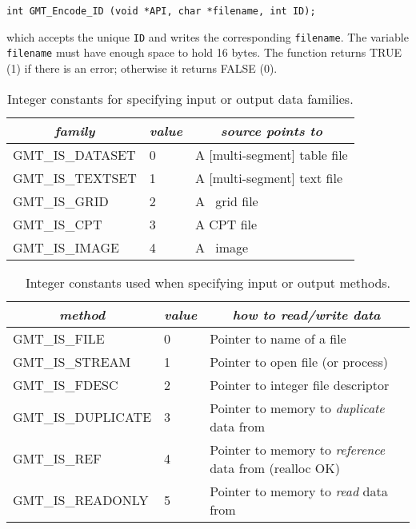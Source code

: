 \documentclass[11pt]{report}
\begin{document}
\begin{verbatim}
int GMT_Encode_ID (void *API, char *filename, int ID);
\end{verbatim}
which accepts the unique \texttt{ID} and writes the corresponding \texttt{filename}.
The variable \texttt{filename} must have enough space to hold 16 bytes.
The function returns TRUE (1) if there is an error; otherwise it returns FALSE (0).

\begin{table}[h]
\small
\centering
\begin{tabular}{|l|l|l|} \hline
\multicolumn{1}{|c|}{\emph{family}} & \multicolumn{1}{c|}{\emph{value}} & \multicolumn{1}{c|}{\emph{source points to}} \\ \hline
GMT\_IS\_DATASET	&	0	&	A [multi-segment] table file \\ \hline
GMT\_IS\_TEXTSET	&	1	&	A [multi-segment] text file \\ \hline
GMT\_IS\_GRID		&	2	&	A \GMT\ grid file \\ \hline
GMT\_IS\_CPT		&	3	&	A CPT file \\ \hline
GMT\_IS\_IMAGE		&	4	&	A \GMT\ image \\ \hline
\end{tabular}
\caption{Integer constants for specifying input or output data families.}
\label{tbl:family}
\end{table}


\begin{table}[h]
\small
\centering
\begin{tabular}{|l|l|l|} \hline
\multicolumn{1}{|c|}{\emph{method}} & \multicolumn{1}{c|}{\emph{value}} & \multicolumn{1}{c|}{\emph{how to read/write data}} \\ \hline
GMT\_IS\_FILE		&	0	&       Pointer to name of a file \\ \hline
GMT\_IS\_STREAM		&	1	&       Pointer to open file (or process)  \\ \hline
GMT\_IS\_FDESC		&	2	&       Pointer to integer file descriptor \\ \hline
GMT\_IS\_DUPLICATE	&	3	&       Pointer to memory to \emph{duplicate} data from \\ \hline
GMT\_IS\_REF		&	4	&       Pointer to memory to \emph{reference} data from (realloc OK) \\ \hline
GMT\_IS\_READONLY	&	5	&       Pointer to memory to \emph{read} data from \\ \hline
\end{tabular}
\caption{Integer constants used when specifying input or output methods.}
\label{tbl:methods}
\end{table}
\end{document}
